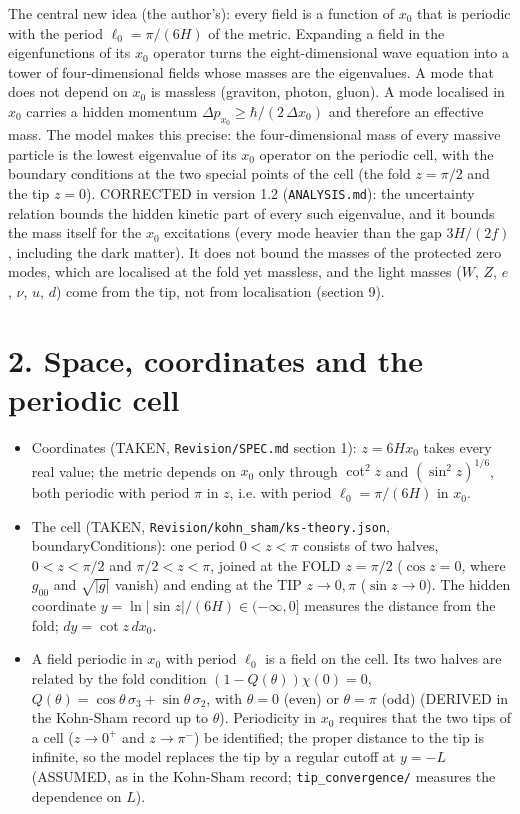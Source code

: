 \documentclass[11pt]{article}
\begin{document}
The central new idea (the author's): every field is a function of $x_0$ that is periodic with the period $\ell_0 = \pi/(6H)$ of the metric. Expanding a field in the eigenfunctions of its $x_0$ operator turns the eight-dimensional wave equation into a tower of four-dimensional fields whose masses are the eigenvalues. A mode that does not depend on $x_0$ is massless (graviton, photon, gluon). A mode localised in $x_0$ carries a hidden momentum $\Delta p_{x_0} \geq \hbar/(2\,\Delta x_0)$ and therefore an effective mass. The model makes this precise: the four-dimensional mass of every massive particle is the lowest eigenvalue of its $x_0$ operator on the periodic cell, with the boundary conditions at the two special points of the cell (the fold $z = \pi/2$ and the tip $z = 0$). CORRECTED in version 1.2 (\texttt{ANALYSIS.\allowbreak{}md}): the uncertainty relation bounds the hidden kinetic part of every such eigenvalue, and it bounds the mass itself for the $x_0$ excitations (every mode heavier than the gap $3H/(2f)$, including the dark matter). It does not bound the masses of the protected zero modes, which are localised at the fold yet massless, and the light masses ($W$, $Z$, $e$, $\nu$, $u$, $d$) come from the tip, not from localisation (section 9).

\section*{2. Space, coordinates and the periodic cell}

\begin{itemize}
\item Coordinates (TAKEN, \texttt{Revision/\allowbreak{}SPEC.\allowbreak{}md} section 1): $z = 6Hx_0$ takes every real value; the metric depends on $x_0$ only through $\cot^2 z$ and $(\sin^2 z)^{1/6}$, both periodic with period $\pi$ in $z$, i.e. with period $\ell_0 = \pi/(6H)$ in $x_0$.
\item The cell (TAKEN, \texttt{Revision/\allowbreak{}kohn\_\allowbreak{}sham/\allowbreak{}ks-{}\allowbreak{}theory.\allowbreak{}json}, boundaryConditions): one period $0 < z < \pi$ consists of two halves, $0 < z < \pi/2$ and $\pi/2 < z < \pi$, joined at the FOLD $z = \pi/2$ ($\cos z = 0$, where $g_{00}$ and $\sqrt{|g|}$ vanish) and ending at the TIP $z \to 0, \pi$ ($\sin z \to 0$). The hidden coordinate $y = \ln|\sin z|/(6H) \in (-\infty, 0]$ measures the distance from the fold; $dy = \cot z\, dx_0$.
\item A field periodic in $x_0$ with period $\ell_0$ is a field on the cell. Its two halves are related by the fold condition $(1 - Q(\theta))\chi(0) = 0$, $Q(\theta) = \cos\theta\,\sigma_3 + \sin\theta\,\sigma_2$, with $\theta = 0$ (even) or $\theta = \pi$ (odd) (DERIVED in the Kohn-Sham record up to $\theta$). Periodicity in $x_0$ requires that the two tips of a cell ($z \to 0^+$ and $z \to \pi^-$) be identified; the proper distance to the tip is infinite, so the model replaces the tip by a regular cutoff at $y = -L$ (ASSUMED, as in the Kohn-Sham record; \texttt{tip\_\allowbreak{}convergence/\allowbreak{}} measures the dependence on $L$).
\end{itemize}
\end{document}
